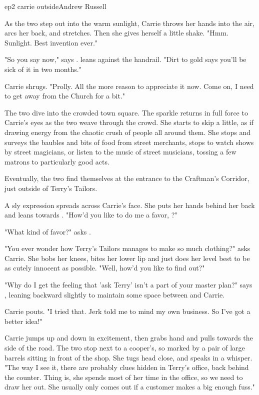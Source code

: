 \documentclass{book}
\begin{document}
\begin{childnode}{ep2 carrie outside}{Andrew Russell}


    As the two step out into the warm sunlight, Carrie throws her hands into the air, arcs her back, and stretches. Then she gives herself a little shake. "Hmm. Sunlight. Best invention ever." 

    "So you say now," says \name{}. \HeShe{} leans against the handrail. "Dirt to gold says you'll be sick of it in two months."

    Carrie shrugs. "Prolly. All the more reason to appreciate it now. Come on, I need to get away from the Church for a bit."

    The two dive into the crowded town square. The sparkle returns in full force to Carrie's eyes as the two weave through the crowd. She starts to skip a little, as if drawing
    energy from the chaotic crush of people all around them. She stops and surveys the baubles and bits of food from street merchants, stops to watch shows by street magicians, or listen to the
    music of street musicians, tossing a few matrons to particularly good acts.

    Eventually, the two find themselves at the entrance to the Craftman's Corridor, just outside of Terry's Tailors.

    A sly expression spreads across Carrie's face. She puts her hands behind her back and leans towards \name{}. "How'd you like to do me a favor, \nickname{}?"

    "What kind of favor?" asks \name{}.

    "You ever wonder how Terry's Tailors manages to make so much clothing?" asks Carrie. She bobs her knees, bites her lower lip and just does her level best to be as cutely innocent as possible. 
    "Well, how'd you like to find out?"

    "Why do I get the feeling that 'ask Terry' isn't a part of your master plan?" says \name{}, leaning backward slightly to maintain some space between \himselfherself{} and Carrie.

    Carrie pouts. "I tried that. Jerk told me to mind my own business. So I've got a better idea!"

    Carrie jumps up and down in excitement, then grabs \names{} hand and pulls \himher{} towards the side of the road. The two stop next to a cooper's, so marked by a pair of large barrels sitting
    in front of the shop. She tugs \names{} head close, and speaks in a whisper. "The way I see it,
    there are probably clues hidden in Terry's office, back behind the counter. Thing is, she spends most of her time in the office, so we need to draw her out. She usually only comes out 
    if a customer makes a big enough fuss."


\end{childnode}
\end{document}
